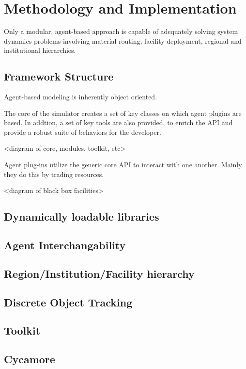 \section{Methodology and Implementation}

Only a modular, agent-based approach is capable of adequately solving system 
dynamics problems involving material routing, facility deployment, regional and 
institutional hierarchies.

\subsection{Framework Structure}

Agent-based modeling is inherently object oriented. 

The core of the simulator creates a set of key classes on which agent plugins 
are based. In addtion, a set of key tools are also provided, to enrich the API 
and provide a robust suite of behaviors for the developer.

<diagram of core, modules, toolkit, etc>

Agent plug-ins utilize the generic core API to interact with one another. 
Mainly they do this by trading resources. 

<diagram of black box facilities>


\subsection{Dynamically loadable libraries}
\subsection{Agent Interchangability}
\subsection{Region/Institution/Facility hierarchy}
\subsection{Discrete Object Tracking}
\subsection{Toolkit}
\subsection{Cycamore}
